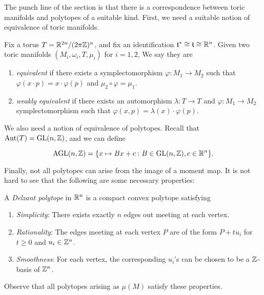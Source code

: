 \documentclass[a4paper]{article}
\begin{document}
The punch line of the section is that there is a correspondence between toric manifolds and polytopes of a suitable kind. First, we need a suitable notion of equivalence of toric manifolds.

\begin{defi}
  Fix a torus $T = \mathbb{R}^{2n}/(2\pi \mathbb{Z})^n$, and fix an identification $\mathfrak{t}^* \cong \mathfrak{t} \cong \mathbb{R}^n$. Given two toric manifolds $(M_i, \omega_i, T, \mu_i)$ for $i = 1, 2$, We say they are
  \begin{enumerate}
    \item \emph{equivalent} if there exists a symplectomorphism $\varphi: M_1 \to M_2$ such that $\varphi(x \cdot p) = x \cdot \varphi(p)$ and $\mu_2 \circ \varphi = \mu_1$.
    \item \emph{weakly equivalent} if there exists an automorphism $\lambda: T \to T$ and $\varphi: M_1 \to M_2$ symplectomorphism such that $\varphi(x, p) = \lambda(x) \cdot \varphi(p)$.
  \end{enumerate}
\end{defi}

We also need a notion of equivalence of polytopes. Recall that $\operatorname{Aut}(T) = \mathrm{GL}(n, \mathbb{Z})$, and we can define
\begin{defi}
  \[
    \mathrm{AGL}(n, \mathbb{Z}) = \{x \mapsto Bx + c: B \in \mathrm{GL}(n, \mathbb{Z}), c \in \mathbb{R}^n\}.
  \]
\end{defi}
Finally, not all polytopes can arise from the image of a moment map. It is not hard to see that the following are some necessary properties:
\begin{defi}
  A \emph{Delzant polytope} in $\mathbb{R}^n$ is a compact convex polytope satisfying
  \begin{enumerate}
    \item \emph{Simplicity}: There exists exactly $n$ edges out meeting at each vertex.
    \item \emph{Rationality}: The edges meeting at each vertex $P$ are of the form $P + t u_i$ for $t \geq 0$ and $u_i \in \mathbb{Z}^n$.
    \item \emph{Smoothness}: For each vertex, the corresponding $u_i$'s can be chosen to be a $\mathbb{Z}$-basis of $\mathbb{Z}^n$.
  \end{enumerate}
\end{defi}
Observe that all polytopes arising as $\mu(M)$ satisfy these properties.
\end{document}
